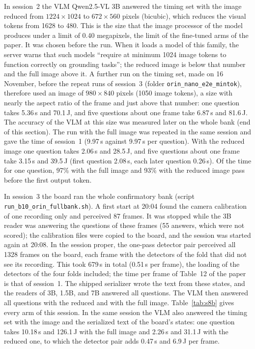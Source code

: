 \documentclass[10pt]{article}
\begin{document}
In session~2 the VLM Qwen2.5-VL 3B answered the timing set with the image reduced from $1224\times1024$ to $672\times560$ pixels (bicubic), which reduces the visual tokens from 1628 to 480. This is the size that the image processor of the model produces under a limit of 0.40 megapixels, the limit of the fine-tuned arms of the paper. It was chosen before the run. When it loads a model of this family, the server warns that such models ``require at minimum 1024 image tokens to function correctly on grounding tasks''; the reduced image is below that number and the full image above it. A further run on the timing set, made on 16 November, before the repeat runs of session~3 (folder \texttt{orin\_nano\_e2e\_mintok}), therefore used an image of $980\times840$ pixels (1050 image tokens), a size with nearly the aspect ratio of the frame and just above that number: one question takes 5.36\,s and 70.1\,J, and five questions about one frame take 6.87\,s and 81.6\,J. The accuracy of the VLM at this size was measured later on the whole bank (end of this section). The run with the full image was repeated in the same session and gave the time of session~1 (9.97\,s against 9.97\,s per question). With the reduced image one question takes 2.06\,s and 28.5\,J, and five questions about one frame take 3.15\,s and 39.5\,J (first question 2.08\,s, each later question 0.26\,s). Of the time for one question, 97\% with the full image and 93\% with the reduced image pass before the first output token.

In session~3 the board ran the whole confirmatory bank (script \texttt{run\_b10\_orin\_fullbank.sh}). A first start at 20:04 found the camera calibration of one recording only and perceived 87 frames. It was stopped while the 3B reader was answering the questions of these frames (55 answers, which were not scored); the calibration files were copied to the board, and the session was started again at 20:08. In the session proper, the one-pass detector pair perceived all 1328 frames on the board, each frame with the detectors of the fold that did not see its recording. This took 679\,s in total (0.51\,s per frame), the loading of the detectors of the four folds included; the time per frame of Table~12 of the paper is that of session~1. The shipped serializer wrote the text from these states, and the readers of 3B, 1.5B, and 7B answered all questions. The VLM then answered all questions with the reduced and with the full image. Table~\ref{tab:s8b} gives every arm of this session. In the same session the VLM also answered the timing set with the image and the serialized text of the board's states: one question takes 10.18\,s and 126.1\,J with the full image and 2.26\,s and 31.1\,J with the reduced one, to which the detector pair adds 0.47\,s and 6.9\,J per frame.
\end{document}
